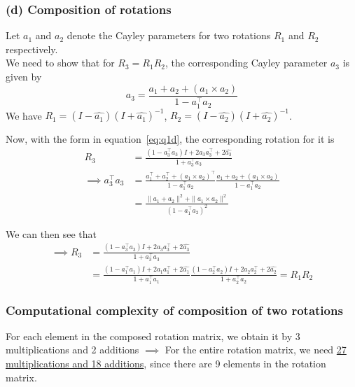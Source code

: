 \subsubsection*{(d) Composition of rotations}

Let \( a_{1} \) and \( a_{2} \) denote the Cayley parameters for two rotations \( R_{1} \) and \( R_{2} \) respectively. \\
We need to show that for \( R_{3}=R_{1} R_{2} \), the corresponding Cayley parameter \( a_{3} \) is given by
\begin{equation}\label{eq:q1d}
    a_{3}=\frac{a_{1}+a_{2}+\left(a_{1} \times a_{2}\right)}{1-a_{1}^{\top} a_{2}}
\end{equation}
We have \( R_1 = (I - \widehat{a_1}) {(I + \widehat{a_1})}^{-1} \), \( R_2 = (I - \widehat{a_2}) {(I + \widehat{a_2})}^{-1} \).

Now, with the form in equation~\eqref{eq:q1d}, the corresponding rotation for it is
\begin{align*}
    R_{3}
     & =
    \frac{(1 - a_3^{\top} a_3) I + 2 a_3 a_3^{\top} + 2 \widehat{a_3}}{1 + a_3^{\top} a_3}
    \\
    \implies
    a_3^{\top} a_3
     & =
    \frac{a_{1}^\top+a_{2}^\top+\left(a_{1} \times a_{2}\right)^\top}{1-a_{1}^{\top} a_{2}}
    \frac{a_{1}+a_{2}+\left(a_{1} \times a_{2}\right)}{1-a_{1}^{\top} a_{2}}
    \\ & =
    \frac{
    \| a_1 + a_2 \|^2 + \| a_1 \times a_2 \|^2
    }{{(1-a_{1}^{\top} a_{2})}^{2}}
\end{align*}

We can then see that
\begin{align*}
    \implies
    R_{3}
     & =
    \frac{(1 - a_3^{\top} a_3) I + 2 a_3 a_3^{\top} + 2 \widehat{a_3}}{1 + a_3^{\top} a_3}
    \\ & =
    \frac{(1 - a_1^{\top} a_1) I + 2 a_1 a_1^{\top} + 2 \widehat{a_1}}{1 + a_1^{\top} a_1}
    \frac{(1 - a_2^{\top} a_2) I + 2 a_2 a_2^{\top} + 2 \widehat{a_2}}{1 + a_2^{\top} a_2}
    =
    R_1 R_2
\end{align*}

\subsubsection*{Computational complexity of composition of two rotations}

For each element in the composed rotation matrix, we obtain it by 3 multiplications and 2 additions \( \implies \) For the entire rotation matrix, we need \underline{27 multiplications and 18 additions}, since there are 9 elements in the rotation matrix.

